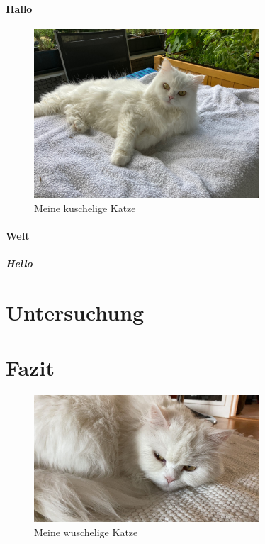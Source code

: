 \documentclass[12pt,parskip=half]{scrartcl}
\begin{document}
\paragraph{Hallo} \blindtext[5]

\begin{figure}
\centering
\includegraphics[width=0.75\textwidth]{Bilder/Katze1}
\caption{Meine kuschelige Katze}\label{fig:katze1}
\end{figure}



\paragraph{Welt} \blindtext[5]

\subparagraph{Hello} \blindtext[5]


\section{Untersuchung}

\blindtext[5] 



\section{Fazit}\label{sec:fazit}

\begin{figure}
\centering
\includegraphics[width=0.75\textwidth,angle=45]{Bilder/miau}
\caption{Meine wuschelige Katze}\label{fig:miau}
\end{figure}
\end{document}
